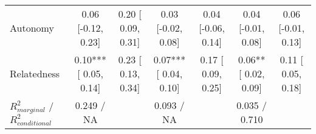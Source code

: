 \begin{landscape}
\begin{table}
\begin{minipage}[t][\textheight][t]{\textwidth}
{\begin{tabular}[t]{lcccccc}
\hspace{1em}Autonomy & 0.06 [-0.12,  0.23] & 0.20 [ 0.09, 0.31] & 0.03 [-0.02,  0.08] & 0.04 [-0.06, 0.14] & 0.04 [-0.01,  0.08] & 0.06 [-0.01, 0.13]\\
\hspace{1em}Relatedness & 0.10*** [ 0.05,  0.14] & 0.23 [ 0.13, 0.34] & 0.07*** [ 0.04,  0.10] & 0.17 [ 0.09, 0.25] & 0.06** [ 0.02,  0.09] & 0.11 [ 0.05, 0.18]\\
\hspace{1em}$R^2_{marginal}$ / $R^2_{conditional}$ & 0.249 / NA &  & 0.093 / NA &  & 0.035 / 0.710 & \\
\bottomrule
\end{tabular}}
\end{minipage}
\end{table}
\end{landscape}
